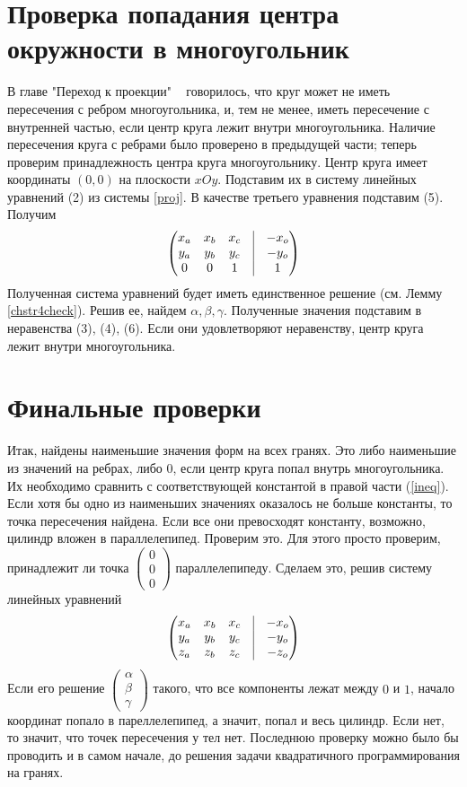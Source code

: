 \documentclass[pdftex,ptm,12pt,a4paper]{report}
\begin{document}
\section{Проверка попадания центра окружности в многоугольник}
  В главе "Переход к проекции" ~ говорилось, что круг может не иметь пересечения с ребром многоугольника,
  и, тем не менее, иметь пересечение с внутренней частью, если центр круга лежит внутри многоугольника.
  Наличие пересечения круга с ребрами было проверено в предыдущей части;
  теперь проверим принадлежность центра круга многоугольнику.
  Центр круга имеет координаты $(0, 0)$ на плоскости $xOy$.
  Подставим их в систему линейных уравнений (2) из системы \ref{proj}.
  В качестве третьего уравнения подставим (5).
  Получим
  \[
    \begin{pmatrix}
     x_a & x_b & x_c & \vrule & -x_o\\
     y_a & y_b & y_c & \vrule & -y_o \\
     0   & 0   & 1   & \vrule & 1
     \end{pmatrix}
  \]
  Полученная система уравнений будет иметь единственное решение (см. Лемму \ref{chstr4check}).
  Решив ее, найдем $\alpha, \beta, \gamma$.
  Полученные значения подставим в неравенства (3), (4), (6).
  Если они удовлетворяют неравенству, центр круга лежит внутри многоугольника.
\section{Финальные проверки}
  Итак, найдены наименьшие значения форм на всех гранях. Это либо наименьшие из значений на ребрах, либо $0$, если центр круга попал внутрь многоугольника.
  Их необходимо сравнить с соответствующей константой в правой части (\ref{ineq}).
  Если хотя бы одно из наименьших значениях оказалось не больше константы, то точка пересечения найдена.
  Если все они превосходят константу, возможно, цилиндр вложен в параллелепипед.
  Проверим это.
  Для этого просто проверим, принадлежит ли точка $\begin{pmatrix}0 \\ 0 \\ 0 \end{pmatrix}$ параллелепипеду.
  Сделаем это, решив систему линейных уравнений
  \[
    \begin{pmatrix}
     x_a & x_b & x_c & \vrule & -x_o\\
     y_a & y_b & y_c & \vrule & -y_o \\
     z_a & z_b & z_c & \vrule & -z_o
     \end{pmatrix}
  \]
  Если его решение $\begin{pmatrix} \alpha \\ \beta \\ \gamma \end{pmatrix}$ такого, что все компоненты лежат между $0$ и $1$, начало координат попало в пареллелепипед, а значит, попал и весь цилиндр. Если нет, то значит, что точек пересечения у тел нет.
  Последнюю проверку можно было бы проводить и в самом начале, до решения задачи квадратичного программирования на гранях.
\clearpage
\end{document}
